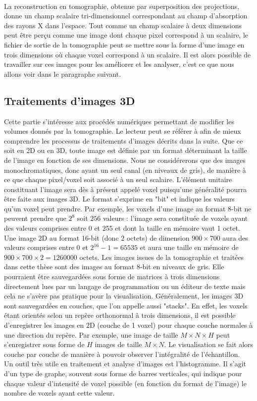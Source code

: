 			\\La reconstruction en tomographie, obtenue par superposition des projections, donne un champ scalaire tri-dimensionnel correspondant au champ d'absorption des rayons X dans l'espace. Tout comme un champ scalaire à deux dimensions peut être perçu comme une image dont chaque pixel correspond à un scalaire, le fichier de sortie de la tomographie peut se mettre sous la forme d'une image en trois dimensions où chaque voxel correspond à un scalaire. Il est alors possible de travailler sur ces images pour les améliorer et les analyser, c'est ce que nous allons voir dans le paragraphe suivant.
	\subsection{Traitements d'images 3D}\label{para03:traitement_image}
		Cette partie s'intéresse aux procédés numériques permettant de modifier les volumes donnés par la tomographie. Le lecteur peut se référer à \citet{bovik_handbook_2010} afin de mieux comprendre les processus de traitements d'images décrits dans la suite. Que ce soit en 2D ou en 3D, toute image est définie par un format déterminant la taille de l'image en fonction de ses dimensions. Nous ne considérerons que des images monochromatiques, donc ayant un seul canal (en niveaux de gris), de manière à ce que chaque pixel/voxel soit associé à un seul scalaire. L'élément unitaire constituant l'image sera dès à présent appelé voxel puisqu'une généralité pourra être faite aux images 3D. Le format s'exprime en "bit" et indique les valeurs qu'un voxel peut prendre. Par exemple, les voxels d'une image au format 8-bit ne peuvent prendre que $2^8$ soit $256$ valeurs : l'image sera constituée de voxels ayant des valeurs comprises entre 0 et 255 et dont la taille en mémoire vaut 1 octet. Une image 2D au format 16-bit (donc $2$ octets) de dimension $900\times 700$ aura des valeurs comprises entre $0$ et $2^{16}-1=65535$ et aura une taille en mémoire de $900\times 700\times 2=1260000$ octets. Les images issues de la tomographie et traitées dans cette thèse sont des images au format 8-bit en niveaux de gris. Elle pourraient être sauvegardées sous forme de matrices à trois dimensions directement lues par un langage de programmation ou un éditeur de texte mais cela ne s'avère pas pratique pour la visualisation. Généralement, les images 3D sont sauvegardées en couches, que l'on appelle aussi "stacks". En effet, les voxels étant orientés selon un repère orthonormal à trois dimensions, il est possible d'enregistrer les images en 2D (couche de 1 voxel) pour chaque couche normales à une direction du repère. Par exemple, une image de taille $M\times N\times H$ peut s'enregistrer sous forme de $H$ images de taille $M\times N$. Le visualisation se fait alors couche par couche de manière à pouvoir observer l'intégralité de l'échantillon.
		\\Un outil très utile en traitement et analyse d'images est l'histogramme. Il s'agit d'un type de graphe, souvent sous forme de barres verticales, qui indique pour chaque valeur d'intensité de voxel possible (en fonction du format de l'image) le nombre de voxels ayant cette valeur.
